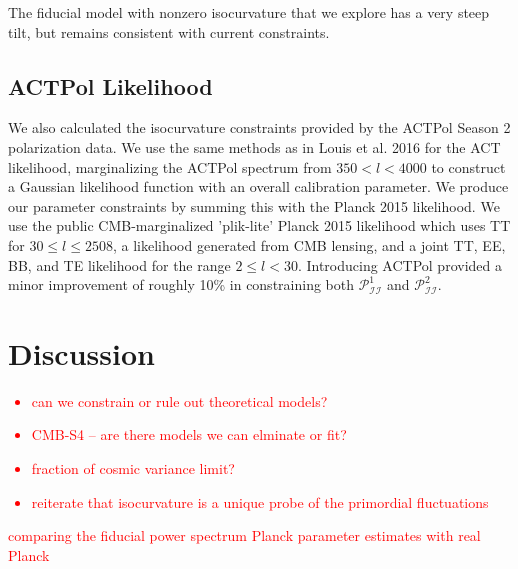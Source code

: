 \documentclass{emulateapj}
\newcommand\writingnote[1]{\textcolor{red}{#1}}
\newcommand{\pii}{ \mathcal{P}_{\mathcal{I}\mathcal{I}} }
\begin{document}
The fiducial model with nonzero isocurvature that we explore has a very steep tilt, but remains consistent with current constraints. 


\subsection{ACTPol Likelihood}\label{actpol}

We also calculated the isocurvature constraints provided by the ACTPol Season 2 polarization data. We use the same methods as in Louis et al. 2016 for the ACT likelihood, marginalizing the ACTPol spectrum from $350 < l < 4000$ to construct a Gaussian likelihood function with an overall calibration parameter. We produce our parameter constraints by summing this with the Planck 2015 likelihood. We use the public CMB-marginalized 'plik-lite' Planck 2015 likelihood which uses TT for $30 \leq l \leq 2508$, a likelihood generated from CMB lensing, and a joint TT, EE, BB, and TE likelihood for the range $2 \leq l < 30$. Introducing ACTPol provided a minor improvement of roughly 10\% in constraining both $\pii^1$ and $\pii^2$.


\section{Discussion}\label{Discussion}
\writingnote{
  \begin{itemize}
    \item can we constrain or rule out theoretical models? 
    \item CMB-S4 -- are there models we can elminate or fit?
    \item fraction of cosmic variance limit?
    \item reiterate that isocurvature is a unique probe of the primordial fluctuations
  \end{itemize}
}

\appendix

\writingnote{comparing the fiducial power spectrum Planck parameter estimates with real Planck}


\end{document}
